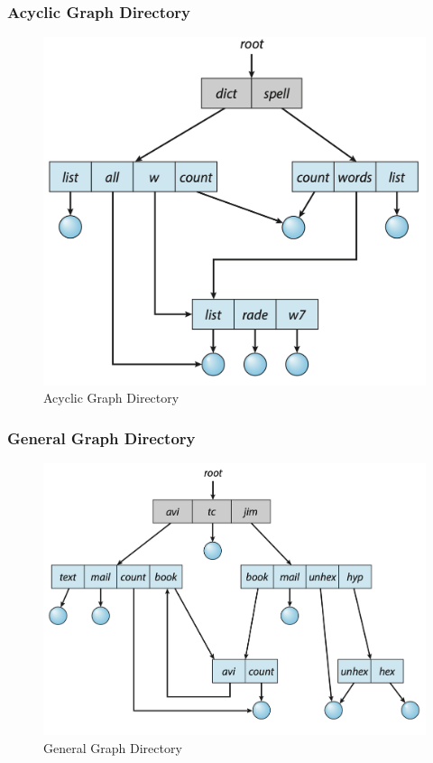 \documentclass{book/custombook}
\begin{document}
                    \subsubsection{Acyclic Graph Directory}
                        \begin{figure}[H]
                            \centering
                            \includegraphics[width=0.6\linewidth]{figures/acyclic_graph_dir.png}
                            \caption{Acyclic Graph Directory}
                        \end{figure}
                    \subsubsection{General Graph Directory}
                        \begin{figure}[H]
                            \centering
                            \includegraphics[width=0.6\linewidth]{figures/general_graph_dir.png}
                            \caption{General Graph Directory}
                        \end{figure}
                        
\end{document}
